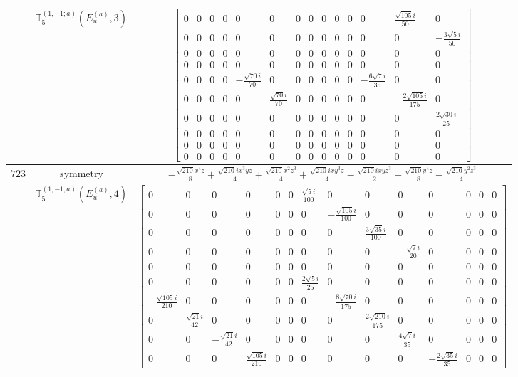 \documentclass[fleqn,8pt,landscape]{jsarticle}
\begin{document}
\begin{longtable}{ccc}
$  $ & $ \mathbb{T}_{5}^{(1,-1;a)}(E_{u}^{(a)},3) $ & $ \begin{bmatrix} 0 & 0 & 0 & 0 & 0 & 0 & 0 & 0 & 0 & 0 & 0 & 0 & \frac{\sqrt{105} i}{50} & 0 \\ 0 & 0 & 0 & 0 & 0 & 0 & 0 & 0 & 0 & 0 & 0 & 0 & 0 & - \frac{3 \sqrt{5} i}{50} \\ 0 & 0 & 0 & 0 & 0 & 0 & 0 & 0 & 0 & 0 & 0 & 0 & 0 & 0 \\ 0 & 0 & 0 & 0 & 0 & 0 & 0 & 0 & 0 & 0 & 0 & 0 & 0 & 0 \\ 0 & 0 & 0 & 0 & - \frac{\sqrt{70} i}{70} & 0 & 0 & 0 & 0 & 0 & 0 & - \frac{6 \sqrt{7} i}{35} & 0 & 0 \\ 0 & 0 & 0 & 0 & 0 & \frac{\sqrt{70} i}{70} & 0 & 0 & 0 & 0 & 0 & 0 & - \frac{2 \sqrt{105} i}{175} & 0 \\ 0 & 0 & 0 & 0 & 0 & 0 & 0 & 0 & 0 & 0 & 0 & 0 & 0 & \frac{2 \sqrt{30} i}{25} \\ 0 & 0 & 0 & 0 & 0 & 0 & 0 & 0 & 0 & 0 & 0 & 0 & 0 & 0 \\ 0 & 0 & 0 & 0 & 0 & 0 & 0 & 0 & 0 & 0 & 0 & 0 & 0 & 0 \\ 0 & 0 & 0 & 0 & 0 & 0 & 0 & 0 & 0 & 0 & 0 & 0 & 0 & 0 \end{bmatrix} $ \\ \hline
$ 723 $ & $ \text{symmetry} $ & $ - \frac{\sqrt{210} x^{4} z}{8} + \frac{\sqrt{210} i x^{3} y z}{4} + \frac{\sqrt{210} x^{2} z^{3}}{4} + \frac{\sqrt{210} i x y^{3} z}{4} - \frac{\sqrt{210} i x y z^{3}}{2} + \frac{\sqrt{210} y^{4} z}{8} - \frac{\sqrt{210} y^{2} z^{3}}{4} $ \\
$  $ & $ \mathbb{T}_{5}^{(1,-1;a)}(E_{u}^{(a)},4) $ & $ \begin{bmatrix} 0 & 0 & 0 & 0 & 0 & 0 & \frac{\sqrt{5} i}{100} & 0 & 0 & 0 & 0 & 0 & 0 & 0 \\ 0 & 0 & 0 & 0 & 0 & 0 & 0 & - \frac{\sqrt{105} i}{100} & 0 & 0 & 0 & 0 & 0 & 0 \\ 0 & 0 & 0 & 0 & 0 & 0 & 0 & 0 & \frac{3 \sqrt{35} i}{100} & 0 & 0 & 0 & 0 & 0 \\ 0 & 0 & 0 & 0 & 0 & 0 & 0 & 0 & 0 & - \frac{\sqrt{7} i}{20} & 0 & 0 & 0 & 0 \\ 0 & 0 & 0 & 0 & 0 & 0 & 0 & 0 & 0 & 0 & 0 & 0 & 0 & 0 \\ 0 & 0 & 0 & 0 & 0 & 0 & \frac{2 \sqrt{5} i}{25} & 0 & 0 & 0 & 0 & 0 & 0 & 0 \\ - \frac{\sqrt{105} i}{210} & 0 & 0 & 0 & 0 & 0 & 0 & - \frac{8 \sqrt{70} i}{175} & 0 & 0 & 0 & 0 & 0 & 0 \\ 0 & \frac{\sqrt{21} i}{42} & 0 & 0 & 0 & 0 & 0 & 0 & \frac{2 \sqrt{210} i}{175} & 0 & 0 & 0 & 0 & 0 \\ 0 & 0 & - \frac{\sqrt{21} i}{42} & 0 & 0 & 0 & 0 & 0 & 0 & \frac{4 \sqrt{7} i}{35} & 0 & 0 & 0 & 0 \\ 0 & 0 & 0 & \frac{\sqrt{105} i}{210} & 0 & 0 & 0 & 0 & 0 & 0 & - \frac{2 \sqrt{35} i}{35} & 0 & 0 & 0 \end{bmatrix} $ \\ \hline

\end{longtable}
\end{document}
